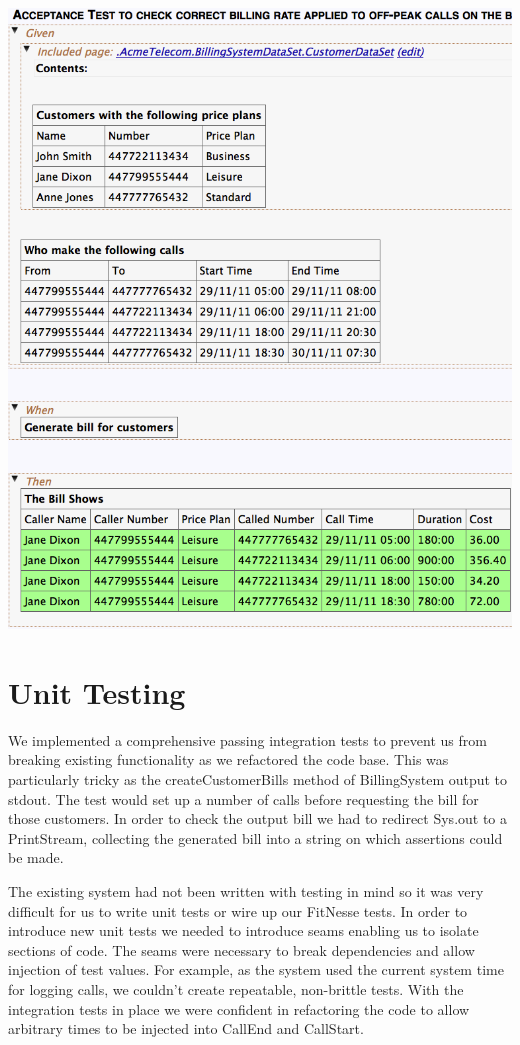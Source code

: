 \documentclass[a4paper,11pt]{article}
\begin{document}
\begin{center}
\includegraphics[scale=0.5]{images/fitnesse_test.png}
\end{center}
\pagebreak

\section{Unit Testing}

We implemented a comprehensive passing integration tests to prevent us from breaking existing functionality as we refactored the code base. This was particularly tricky as the createCustomerBills method of BillingSystem output to stdout. The test would set up a number of calls before requesting the bill for those customers. In order to check the output bill we had to redirect Sys.out to a PrintStream, collecting the generated bill into a string on which assertions could be made.

The existing system had not been written with testing in mind so it was very difficult for us to write unit tests or wire up our FitNesse tests. In order to introduce new unit tests we needed to introduce seams enabling us to isolate sections of code. The seams were necessary to break dependencies and allow injection of test values. For example, as the system used the current system time for logging calls, we couldn't create repeatable, non-brittle tests. With the integration tests in place we were confident in refactoring the code to allow arbitrary times to be injected into CallEnd and CallStart.
\end{document}
